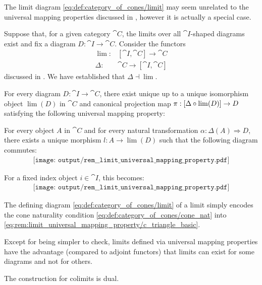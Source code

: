 \begin{remark}\label{rem:limit_universal_mapping_property}
  The limit diagram \eqref{eq:def:category_of_cones/limit} may seem unrelated to the universal mapping properties discussed in , however it is actually a special case.

  Suppose that, for a given category \( \cat{C} \), the limits over all \( \cat{I} \)-shaped diagrams exist and fix a diagram \( D: \cat{I} \to \cat{C} \). Consider the functors
  \begin{align*}
    \lim:   &[\cat{I}, \cat{C}] \to \cat{C} \\
    \Delta: &\cat{C} \to [\cat{I}, \cat{C}]
  \end{align*}
  discussed in . We have established that \( \Delta \dashv \lim \).

  For every diagram \( D: \cat{I} \to \cat{C} \), there exist unique up to a unique isomorphism object \( \lim(D) \) in \( \cat{C} \) and canonical projection map \( \pi: [\Delta \bincirc {\lim}(D)] \to D \) satisfying the following universal mapping property:
  \begin{displayquote}
    For every object \( A \) in \( \cat{C} \) and for every natural transformation \( \alpha: \Delta(A) \Rightarrow D \), there exists a unique morphism \( l: A \to \lim(D) \) such that the following diagram commutes:
    \begin{equation}\label{eq:rem:limit_universal_mapping_property/ic_triangle}
      \begin{aligned}
        \texttt{[image: output/rem\_\_limit\_universal\_mapping\_property.pdf]}
      \end{aligned}
    \end{equation}
  \end{displayquote}

  For a fixed index object \( i \in \cat{I} \), this becomes:
  \begin{equation}\label{eq:rem:limit_universal_mapping_property/c_triangle_basic}
    \begin{aligned}
      \texttt{[image: output/rem\_\_limit\_universal\_mapping\_property.pdf]}
    \end{aligned}
  \end{equation}

  The defining diagram \eqref{eq:def:category_of_cones/limit} of a limit simply encodes the cone naturality condition \eqref{eq:def:category_of_cones/cone_nat} into \eqref{eq:rem:limit_universal_mapping_property/c_triangle_basic}.

  Except for being simpler to check, limits defined via universal mapping properties have the advantage (compared to adjoint functors) that limits can exist for some diagrams and not for others.

  The construction for colimits is dual.
\end{remark}
